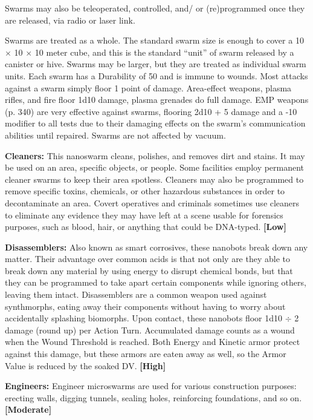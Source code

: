 Swarms may also be teleoperated, controlled, and/ or (re)programmed once they are released, via radio or laser link. 

Swarms are treated as a whole. The standard swarm size is enough to cover a 10 $\times$ 10 $\times$ 10 meter cube, and this is the standard ``unit'' of swarm released by a canister or hive. Swarms may be larger, but they are treated as individual swarm units. Each swarm has a Durability of 50 and is immune to wounds. Most attacks against a swarm simply floor 1 point of damage. Area-effect weapons, plasma rifles, and fire floor 1d10 damage, plasma grenades do full damage. EMP weapons (p. 340) are very effective against swarms, flooring 2d10 + 5 damage and a -10 modifier to all tests due to their damaging effects on the swarm’s communication abilities until repaired. Swarms are not affected by vacuum. 

\textbf{Cleaners:} This nanoswarm cleans, polishes, and removes dirt and stains. It may be used on an area, specific objects, or people. Some facilities employ permanent cleaner swarms to keep their area spotless. Cleaners may also be programmed to remove specific toxins, chemicals, or other hazardous substances in order to decontaminate an area. Covert operatives and criminals sometimes use cleaners to eliminate any evidence they may have left at a scene usable for forensics purposes, such as blood, hair, or anything that could be DNA-typed. \textbf{[Low]} 

\textbf{Disassemblers:} Also known as smart corrosives, these nanobots break down any matter. Their advantage over common acids is that not only are they able to break down any material by using energy to disrupt chemical bonds, but that they can be programmed to take apart certain components while ignoring others, leaving them intact. Disassemblers are a common weapon used against synthmorphs, eating away their components without having to worry about accidentally splashing biomorphs. Upon contact, these nanobots floor 1d10 $\div$ 2 damage (round up) per Action Turn. Accumulated damage counts as a wound when the Wound Threshold is reached. Both Energy and Kinetic armor protect against this damage, but these armors are eaten away as well, so the Armor Value is reduced by the soaked DV. \textbf{[High]} 

\textbf{Engineers:} Engineer microswarms are used for various construction purposes: erecting walls, digging tunnels, sealing holes, reinforcing foundations, and so on. \textbf{[Moderate]} 


